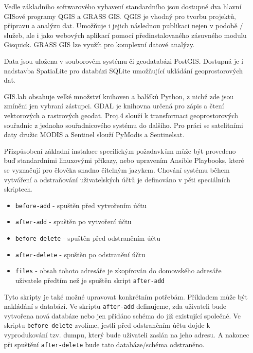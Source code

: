 Vedle základního softwarového vybavení standardního  jsou
dostupné dva hlavní GISové programy QGIS a GRASS GIS. QGIS je vhodný
pro tvorbu projektů, přípravu a analýzu dat. Umožňuje i jejich
následnou publikaci nejen v podobě / služeb, ale i
jako webových aplikací pomocí předinstalovaného zásuvného modulu
Gisquick. GRASS GIS lze využít pro komplexní datové analýzy.

Data jsou uložena v souborovém systému či geodatabázi
PostGIS. Dostupná je i nadstavba SpatiaLite pro databázi SQLite
umožňující ukládání geoprostorových dat.

GIS.lab obsahuje velké množství knihoven a balíčků Python, z nichž zde
jsou zmíněni jen vybraní zástupci. GDAL je knihovna určená pro zápis a
čtení vektorových a rastrových geodat. Proj.4 slouží k transformaci
geoprostorových souřadnic z jednoho souřadnicového systému do
dalšího. Pro práci se satelitními daty družic MODIS a Sentinel slouží
PyModis a Sentinelsat.

Přizpůsobení základní instalace specifickým požadavkům může být
provedeno buď standardními linuxovými příkazy, nebo upravením Ansible
Playbooks, které se vyznačují pro člověka snadno čitelným
jazykem. Chování systému během vytváření a odstraňování uživatelských
účtů je definováno v pěti speciálních skriptech.
\begin{itemize}
\item \texttt{before-add} - spuštěn před vytvořením účtu
\item \texttt{after-add} - spuštěn po vytvoření účtu
\item \texttt{before-delete} - spuštěn před odstraněním účtu
\item \texttt{after-delete} - spuštěn po odstranění účtu
\item \texttt{files} - obsah tohoto adresáře je zkopírován do domovského adresáře uživatele předtím než je spuštěn skript \texttt{after-add}
\end{itemize}
Tyto skripty je také možné upravovat konkrétním potřebám. Příkladem
může být nakládání s databází. Ve skriptu \texttt{after-add}
definujeme, zda uživateli bude vytvořena nová databáze nebo jen
přidáno schéma do již existující společné. Ve skriptu
\texttt{before-delete} zvolíme, jestli před odstraněním účtu dojde k
vyprodukování tzv. dumpu, který bude uživateli zaslán na jeho
adresu. A nakonec při spuštění \texttt{after-delete} bude tato
databáze/schéma odstraněno.

